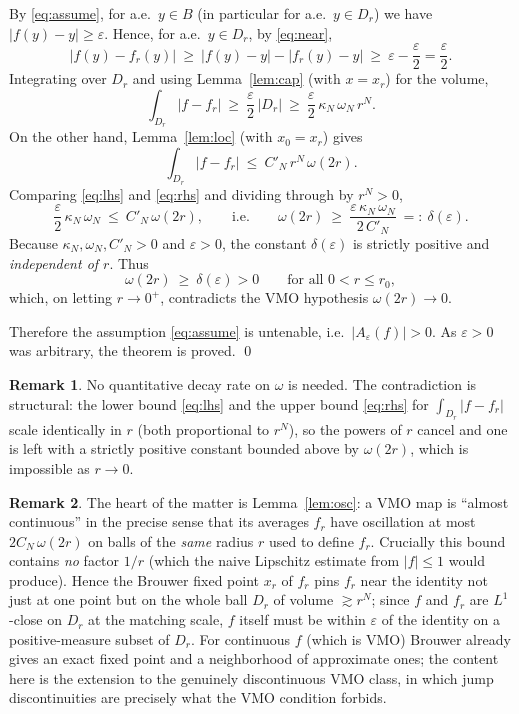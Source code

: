 \documentclass{amsart}
\theoremstyle{definition}
\newtheorem{remark}{Remark}
\begin{document}
By \eqref{eq:assume}, for a.e.\ $y\in B$ (in particular for a.e.\ $y\in D_r$) we
have $|f(y)-y|\ge\varepsilon$. Hence, for a.e.\ $y\in D_r$, by \eqref{eq:near},
\[
|f(y)-f_r(y)|\ \ge\ |f(y)-y|-|f_r(y)-y|\ \ge\ \varepsilon-\frac{\varepsilon}{2}
=\frac{\varepsilon}{2} .
\]
Integrating over $D_r$ and using Lemma~\ref{lem:cap} (with $x=x_r$) for the volume,
\begin{equation}\label{eq:lhs}
\int_{D_r}|f-f_r|\ \ge\ \frac{\varepsilon}{2}\,|D_r|
\ \ge\ \frac{\varepsilon}{2}\,\kappa_N\,\omega_N\,r^N .
\end{equation}
On the other hand, Lemma~\ref{lem:loc} (with $x_0=x_r$) gives
\begin{equation}\label{eq:rhs}
\int_{D_r}|f-f_r|\ \le\ C'_N\,r^N\,\omega(2r).
\end{equation}
Comparing \eqref{eq:lhs} and \eqref{eq:rhs} and dividing through by $r^N>0$,
\[
\frac{\varepsilon}{2}\,\kappa_N\,\omega_N\ \le\ C'_N\,\omega(2r),
\qquad\text{i.e.}\qquad
\omega(2r)\ \ge\ \frac{\varepsilon\,\kappa_N\,\omega_N}{2\,C'_N}\ =:\ \delta(\varepsilon).
\]
Because $\kappa_N,\omega_N,C'_N>0$ and $\varepsilon>0$, the constant
$\delta(\varepsilon)$ is strictly positive and \emph{independent of $r$}. Thus
\[
\omega(2r)\ \ge\ \delta(\varepsilon)>0\qquad\text{for all }0<r\le r_0 ,
\]
which, on letting $r\to0^+$, contradicts the VMO hypothesis $\omega(2r)\to0$.

Therefore the assumption \eqref{eq:assume} is untenable, i.e.\
$|A_\varepsilon(f)|>0$. As $\varepsilon>0$ was arbitrary, the theorem is proved.
\qed

\begin{remark}
No quantitative decay rate on $\omega$ is needed. The contradiction is structural:
the lower bound \eqref{eq:lhs} and the upper bound \eqref{eq:rhs} for
$\int_{D_r}|f-f_r|$ scale identically in $r$ (both proportional to $r^N$), so the
powers of $r$ cancel and one is left with a strictly positive constant bounded
above by $\omega(2r)$, which is impossible as $r\to0$.
\end{remark}

\begin{remark}
The heart of the matter is Lemma~\ref{lem:osc}: a VMO map is ``almost continuous''
in the precise sense that its averages $f_r$ have oscillation at most
$2C_N\,\omega(2r)$ on balls of the \emph{same} radius $r$ used to define $f_r$.
Crucially this bound contains \emph{no} factor $1/r$ (which the naive Lipschitz
estimate from $|f|\le1$ would produce). Hence the Brouwer fixed point $x_r$ of
$f_r$ pins $f_r$ near the identity not just at one point but on the whole ball
$D_r$ of volume $\gtrsim r^N$; since $f$ and $f_r$ are $L^1$-close on $D_r$ at the
matching scale, $f$ itself must be within $\varepsilon$ of the identity on a
positive-measure subset of $D_r$. For continuous $f$ (which is VMO) Brouwer already
gives an exact fixed point and a neighborhood of approximate ones; the content here
is the extension to the genuinely discontinuous VMO class, in which jump
discontinuities are precisely what the VMO condition forbids.
\end{remark}
\end{document}
